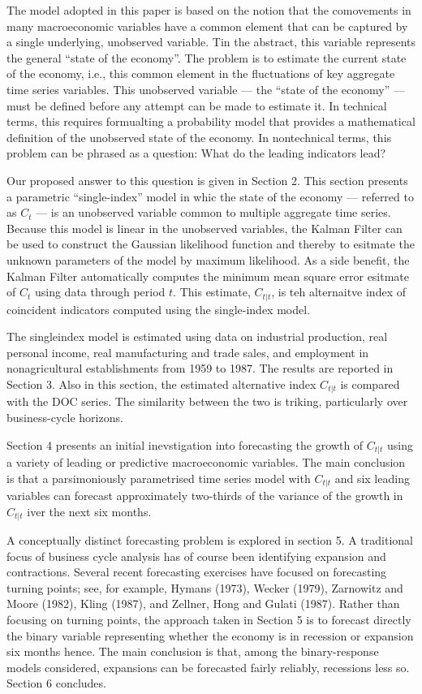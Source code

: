 The model adopted in this paper is based on the  notion that the comovements in many macroeconomic variables have a common element that can be captured by a single underlying, unobserved variable. Tin the abstract, this variable represents the general ``state of the economy''. The problem is to estimate the current state of the economy, i.e., this common element in the fluctuations of key aggregate time series variables. This unobserved variable — the ``state of the economy'' — must be defined before any attempt can be made to estimate it. In technical terms, this requires formualting a probability model that provides a mathematical definition of the unobserved state of the economy. In nontechnical terms, this problem can be phrased as a question: What do the leading indicators lead?

Our proposed answer to this question is given in Section 2. This section presents a parametric ``single-index'' model in whic the state of the economy — referred to as $C_t$ — is an unobserved variable common to multiple aggregate time series. Because this model is linear in the unobserved variables, the Kalman Filter can be used to construct the Gaussian likelihood function and thereby to esitmate the unknown parameters of the model by maximum likelihood. As a side benefit, the Kalman Filter automatically computes the minimum mean square error esitmate of $C_t$ using data through period $t$. This estimate, $C_{t|t}$, is teh alternaitve index of coincident indicators computed using the single-index model.

The singleindex model is estimated using data on industrial production, real personal income, real manufacturing and trade sales, and employment in nonagricultural establishments from 1959 to 1987. The results are reported in Section 3. Also in this section, the estimated alternative index $C_{t|t}$ is compared with the DOC series. The similarity between the two is triking, particularly over business-cycle horizons.

Section 4 presents an initial inevstigation into forecasting the growth of $C_{t|t}$ using a variety of leading or predictive macroeconomic variables. The main conclusion is that a parsimoniously parametrised time series model with $C_{t|t}$ and six leading variables can forecast approximately two-thirds of the variance of the growth in $C_{t|t}$ iver the next six months.

A conceptually distinct forecasting problem is explored in section 5. A traditional focus of business cycle analysis has of course been identifying expansion and contractions. Several recent forecasting exercises have focused on forecasting turning points; see, for example, Hymans (1973), Wecker (1979), Zarnowitz and Moore (1982), Kling (1987), and Zellner, Hong and Gulati (1987). Rather than focusing on turning points, the approach taken in Section 5 is to forecast directly the binary variable representing whether the economy is in recession or expansion six months hence. The main conclusion is that, among the binary-response models considered, expansions can be forecasted fairly reliably, recessions less so. Section 6 concludes.

